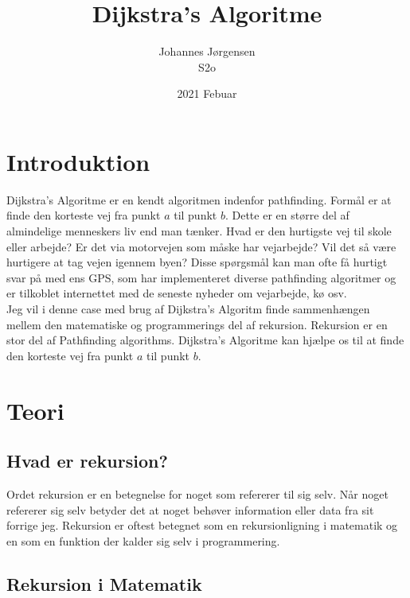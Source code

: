 \documentclass[12pt]{article}
\begin{document}
\title{Dijkstra's Algoritme}
\author{Johannes Jørgensen\\ S2o}
\date{2021 Febuar}
\maketitle
\pagebreak
\tableofcontents
\pagebreak

\section{Introduktion}
Dijkstra's Algoritme er en kendt algoritmen indenfor pathfinding. Formål er at finde den korteste vej fra punkt $a$ til punkt $b$. Dette er en større del af almindelige menneskers liv end man tænker. Hvad er den hurtigste vej til skole eller arbejde? Er det via motorvejen som måske har vejarbejde? Vil det så være hurtigere at tag vejen igennem byen? Disse spørgsmål kan man ofte få hurtigt svar på med ens GPS, som har implementeret diverse pathfinding algoritmer og er tilkoblet internettet med de seneste nyheder om vejarbejde, kø osv. 
\\Jeg vil i denne case med brug af Dijkstra's Algoritm finde sammenhængen mellem den matematiske og programmerings del af rekursion. Rekursion er en stor del af Pathfinding algorithms. Dijkstra's Algoritme kan hjælpe os til at finde den korteste vej fra punkt $a$ til punkt $b$.
\section{Teori}

\subsection{Hvad er rekursion?}
Ordet rekursion er en betegnelse for noget som refererer til sig selv. Når noget refererer sig selv betyder det at noget behøver information eller data fra sit forrige jeg. Rekursion er oftest betegnet som en rekursionligning i matematik og en som en funktion der kalder sig selv i programmering. 

\subsection{Rekursion i Matematik}
\end{document}
